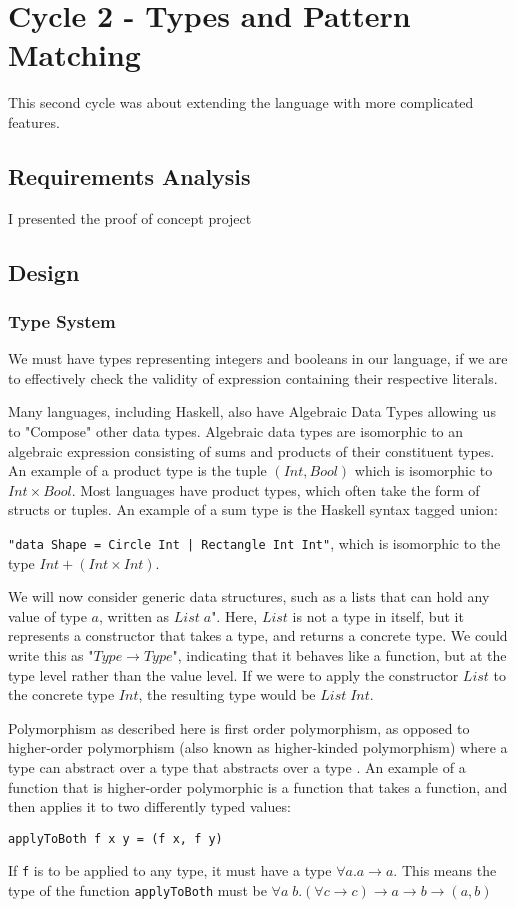 \chapter{Cycle 2 - Types and Pattern Matching}
This second cycle was about extending the language with more complicated features. 

\section{Requirements Analysis}
I presented the proof of concept project 

\section{Design}
\subsection{Type System}
We must have types representing integers and booleans in our language, if we are to effectively check the validity of expression containing their respective literals. 

Many languages, including Haskell, also have Algebraic Data Types allowing us to "Compose" other data types. Algebraic data types are isomorphic to an algebraic expression consisting of sums and products of their constituent types. An example of a product type is the tuple \((Int,Bool)\) which is isomorphic to \(Int \times Bool\). Most languages have product types, which often take the form of structs or tuples. 
An example of a sum type is the Haskell syntax tagged union:

\noindent\verb!"data Shape = Circle Int | Rectangle Int Int"!, which is isomorphic to the type \(Int + (Int \times Int)\). 

We will now consider generic data structures, such as a lists that can hold any value of type $a$, written as \(List\;a\)". Here, \(List\) is not a type in itself, but it represents a constructor that takes a type, and returns a concrete type. We could write this as "$Type \rightarrow Type$", indicating that it behaves like a function, but at the type level rather than the value level. If we were to apply the constructor \(List\) to the concrete type \(Int\), the resulting type would be \(List \;Int\). 

Polymorphism as described here is first order polymorphism, as opposed to higher-order polymorphism (also known as higher-kinded polymorphism) where a type can abstract over a type that abstracts over a type \cite{pierce2002types}. An example of a function that is higher-order polymorphic is a function that takes a function, and then applies it to two differently typed values:
\begin{lstlisting}
applyToBoth f x y = (f x, f y)
\end{lstlisting}
If \verb|f| is to be applied to any type, it must have a type \(\forall a. a\rightarrow a\). This means the type of the function \verb|applyToBoth| must be \(\forall a \;b.(\forall c \rightarrow c) \rightarrow a \rightarrow b \rightarrow (a, b)\)

